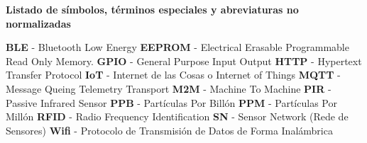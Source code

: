 \renewcommand{\thepage}{\Roman{page}}
    \textbf{\Large Listado de símbolos, términos especiales y abreviaturas no normalizadas}\newline

    \textbf{BLE} - Bluetooth Low Energy
    \newline
    \textbf{EEPROM} - Electrical Erasable Programmable Read Only Memory.
    \newline
    \textbf{GPIO} - General Purpose Input Output
    \newline
    \textbf{HTTP} - Hypertext Transfer Protocol
    \newline
    \textbf{IoT} - Internet de las Cosas o Internet of Things
    \newline
    \textbf{MQTT} - Message Queing Telemetry Transport
    \newline
    \textbf{M2M} - Machine To Machine
    \newline
    \textbf{PIR} - Passive Infrared Sensor
    \newline
    \textbf{PPB} - Partículas Por Billón
    \newline
    \textbf{PPM} - Partículas Por Millón
    \newline
    \textbf{RFID} - Radio Frequency Identification
    \newline
    \textbf{SN} - Sensor Network (Rede de Sensores)
    \newline
    \textbf{Wifi} - Protocolo de Transmisión de Datos de Forma Inalámbrica
    
    
    
    
    
    
    
    \setcounter{page}{1}
    \thispagestyle{plain}